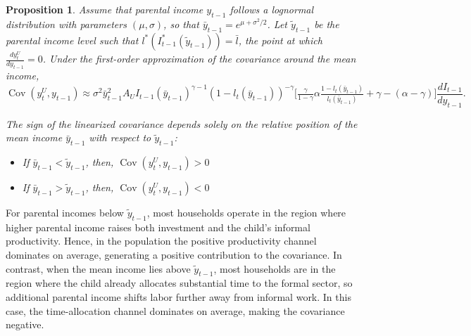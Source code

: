 \documentclass[12pt]{article}
\newtheorem{proposition}{Proposition}
\begin{document}
\begin{proposition}
Assume that parental income $y_{t-1}$ follows a lognormal distribution with parameters $(\mu,\sigma)$, so that 
$\bar y_{t-1} = e^{\mu+\sigma^2/2}$.  
Let $\tilde y_{t-1}$ be the parental income level such that 
$l^*(I_{t-1}^*(\tilde y_{t-1}))=\bar l$, the point at which $\frac{d y_t^U}{dy_{t-1}}=0$.  
Under the first-order approximation of the covariance around the mean income,
\[
\operatorname{Cov}(y_t^U, y_{t-1}) \approx \sigma^2 \bar{y}_{t-1}^2 
A_U I_{t-1}(\bar{y}_{t-1})^{\gamma-1} (1-l_t(\bar{y}_{t-1}))^{-\gamma}
\Big[\tfrac{\gamma}{1-\gamma}\alpha\tfrac{1-l_t(\bar{y}_{t-1})}{l_t(\bar{y}_{t-1})}+\gamma-(\alpha-\gamma)\Big]
\frac{d I_{t-1}}{d y_{t-1}}.
\]

The sign of the linearized covariance depends solely on the relative position of the mean income $\bar y_{t-1}$ with respect to $\tilde y_{t-1}$:
\begin{itemize}
  \item If $\bar y_{t-1}<\tilde y_{t-1}$, then, $\operatorname{Cov}(y_t^U, y_{t-1})>0$
  \item If $\bar y_{t-1}>\tilde y_{t-1}$, then, $\operatorname{Cov}(y_t^U, y_{t-1})<0$
\end{itemize}
\end{proposition}

For parental incomes below $\tilde y_{t-1}$, most households operate in the region where higher parental income raises both investment and the child's informal productivity. Hence, in the population the positive productivity channel dominates on average, generating a positive contribution to the covariance. 
In contrast, when the mean income lies above $\tilde y_{t-1}$, most households are in the region where the child already allocates substantial time to the formal sector, so additional parental income shifts labor further away from informal work. In this case, the time-allocation channel dominates on average, making the covariance negative.

\printbibliography
\end{document}
